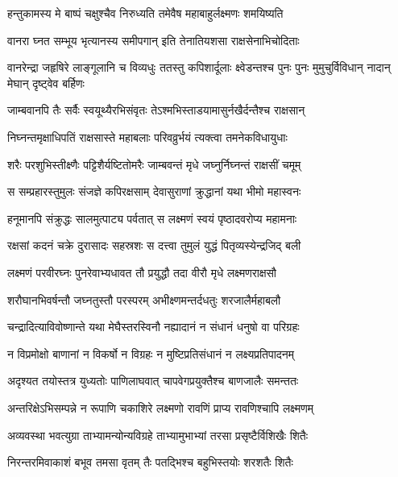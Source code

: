 \twolineshloka
{हन्तुकामस्य मे बाष्पं चक्षुश्चैव निरुध्यति}
{तमेवैष महाबाहुर्लक्ष्मणः शमयिष्यति} %

\twolineshloka
{वानरा घ्नत सम्भूय भृत्यानस्य समीपगान्}
{इति तेनातियशसा राक्षसेनाभिचोदिताः} %

\threelineshloka
{वानरेन्द्रा जहृषिरे लाङ्गूलानि च विव्यधुः}
{ततस्तु कपिशार्दूलाः क्ष्वेडन्तश्च पुनः पुनः}
{मुमुचुर्विविधान् नादान् मेघान् दृष्ट्वेव बर्हिणः} %

\twolineshloka
{जाम्बवानपि तैः सर्वैः स्वयूथ्यैरभिसंवृतः}
{तेऽश्मभिस्ताडयामासुर्नखैर्दन्तैश्च राक्षसान्} %

\twolineshloka
{निघ्नन्तमृक्षाधिपतिं राक्षसास्ते महाबलाः}
{परिवव्रुर्भयं त्यक्त्वा तमनेकविधायुधाः} %

\twolineshloka
{शरैः परशुभिस्तीक्ष्णैः पट्टिशैर्यष्टितोमरैः}
{जाम्बवन्तं मृधे जघ्नुर्निघ्नन्तं राक्षसीं चमूम्} %

\twolineshloka
{स सम्प्रहारस्तुमुलः संजज्ञे कपिरक्षसाम्}
{देवासुराणां क्रुद्धानां यथा भीमो महास्वनः} %

\twolineshloka
{हनूमानपि संक्रुद्धः सालमुत्पाट्य पर्वतात्}
{स लक्ष्मणं स्वयं पृष्ठादवरोप्य महामनाः} %

\twolineshloka
{रक्षसां कदनं चक्रे दुरासादः सहस्रशः}
{स दत्त्वा तुमुलं युद्धं पितृव्यस्येन्द्रजिद् बली} %

\twolineshloka
{लक्ष्मणं परवीरघ्नः पुनरेवाभ्यधावत}
{तौ प्रयुद्धौ तदा वीरौ मृधे लक्ष्मणराक्षसौ} %

\twolineshloka
{शरौघानभिवर्षन्तौ जघ्नतुस्तौ परस्परम्}
{अभीक्ष्णमन्तर्दधतुः शरजालैर्महाबलौ} %

\twolineshloka
{चन्द्रादित्याविवोष्णान्ते यथा मेघैस्तरस्विनौ}
{नह्यादानं न संधानं धनुषो वा परिग्रहः} %

\twolineshloka
{न विप्रमोक्षो बाणानां न विकर्षो न विग्रहः}
{न मुष्टिप्रतिसंधानं न लक्ष्यप्रतिपादनम्} %

\twolineshloka
{अदृश्यत तयोस्तत्र युध्यतोः पाणिलाघवात्}
{चापवेगप्रयुक्तैश्च बाणजालैः समन्ततः} %

\twolineshloka
{अन्तरिक्षेऽभिसम्पन्ने न रूपाणि चकाशिरे}
{लक्ष्मणो रावणिं प्राप्य रावणिश्चापि लक्ष्मणम्} %

\twolineshloka
{अव्यवस्था भवत्युग्रा ताभ्यामन्योन्यविग्रहे}
{ताभ्यामुभाभ्यां तरसा प्रसृष्टैर्विशिखैः शितैः} %

\twolineshloka
{निरन्तरमिवाकाशं बभूव तमसा वृतम्}
{तैः पतद्भिश्च बहुभिस्तयोः शरशतैः शितैः} %

